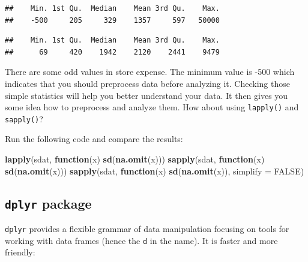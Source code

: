 \documentclass[12pt,]{krantz}
\makeatletter
\newenvironment{Shaded}{\begin{snugshade}}{\end{snugshade}}
\newcommand{\ControlFlowTok}[1]{\textcolor[rgb]{0.27,0.27,0.27}{\textbf{#1}}}
\newcommand{\DataTypeTok}[1]{\textcolor[rgb]{0.27,0.27,0.27}{#1}}
\newcommand{\KeywordTok}[1]{\textcolor[rgb]{0.27,0.27,0.27}{\textbf{#1}}}
\newcommand{\NormalTok}[1]{#1}
\newcommand{\OperatorTok}[1]{\textcolor[rgb]{0.43,0.43,0.43}{\textbf{#1}}}
\newcommand{\OtherTok}[1]{\textcolor[rgb]{0.37,0.37,0.37}{#1}}
\newenvironment{kframe}{%
\medskip{}
\setlength{\fboxsep}{.8em}
 \def\at@end@of@kframe{}%
 \ifinner\ifhmode%
  \def\at@end@of@kframe{\end{minipage}}%
  \begin{minipage}{\columnwidth}%
 \fi\fi%
 \def\FrameCommand##1{\hskip\@totalleftmargin \hskip-\fboxsep
 \colorbox{shadecolor}{##1}\hskip-\fboxsep
     \hskip-\linewidth \hskip-\@totalleftmargin \hskip\columnwidth}%
 \MakeFramed {\advance\hsize-\width
   \@totalleftmargin\z@ \linewidth\hsize
   \@setminipage}}%
 {\par\unskip\endMakeFramed%
 \at@end@of@kframe}
\renewenvironment{Shaded}{\begin{kframe}}{\end{kframe}}
\makeatother
\begin{document}
\begin{verbatim}
##    Min. 1st Qu.  Median    Mean 3rd Qu.    Max. 
##    -500     205     329    1357     597   50000
\end{verbatim}

\begin{Shaded}
\end{Shaded}

\begin{verbatim}
##    Min. 1st Qu.  Median    Mean 3rd Qu.    Max. 
##      69     420    1942    2120    2441    9479
\end{verbatim}

There are some odd values in store expense. The minimum value is -500 which indicates that you should preprocess data before analyzing it. Checking those simple statistics will help you better understand your data. It then gives you some idea how to preprocess and analyze them. How about using \texttt{lapply()} and \texttt{sapply()}?

Run the following code and compare the results:

\begin{Shaded}
\begin{Highlighting}[]
\KeywordTok{lapply}\NormalTok{(sdat, }\ControlFlowTok{function}\NormalTok{(x) }\KeywordTok{sd}\NormalTok{(}\KeywordTok{na.omit}\NormalTok{(x)))}
\KeywordTok{sapply}\NormalTok{(sdat, }\ControlFlowTok{function}\NormalTok{(x) }\KeywordTok{sd}\NormalTok{(}\KeywordTok{na.omit}\NormalTok{(x)))}
\KeywordTok{sapply}\NormalTok{(sdat, }\ControlFlowTok{function}\NormalTok{(x) }\KeywordTok{sd}\NormalTok{(}\KeywordTok{na.omit}\NormalTok{(x)), }\DataTypeTok{simplify =} \OtherTok{FALSE}\NormalTok{)}
\end{Highlighting}
\end{Shaded}

\hypertarget{dplyr-package}{%
\subsection{\texorpdfstring{\texttt{dplyr} package}{dplyr package}}\label{dplyr-package}}

\texttt{dplyr} provides a flexible grammar of data manipulation focusing on tools for working with data frames (hence the \texttt{d} in the name). It is faster and more friendly:
\end{document}
